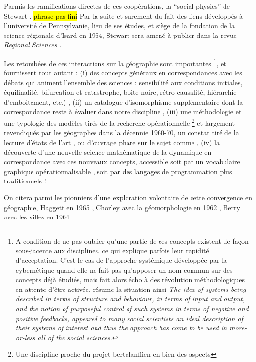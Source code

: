 Parmis les ramifications directes de ces coopérations, la \enquote{social physics} de Stewart \autocite{Stewart1947}. \hl{phrase pas fini}
Par la suite et surement du fait des liens développés à l'université de Pennsylvanie, lieu de ses études, et siège de la fondation de la science régionale d'Isard en 1954, Stewart sera amené à publier dans la revue \textit{Regional Sciences} \autocite{Stewart1958}.

Les retombées de ces interactions sur la géographie sont importantes \footnote{ A condition de ne pas oublier qu'une partie de ces concepts existent de façon sous-jacente aux disciplines, ce qui explique parfois leur rapidité d'acceptation. C'est le cas de l'approche systémique développée par la cybernétique quand elle ne fait pas qu'apposer un nom commun sur des concepts déjà étudiés, mais fait alors écho à des révolution méthodologiques en attente d'être activée. \textcite[5]{Batty1976} résume la situation ainsi \textit{The idea of systems being described in terms of structure and behaviour, in terms of input and output, and the notion of purposeful control of such systems in terms of negative and positive feedbacks, appeared to many social scientists an ideal description of their systems of interest and thus the approach has come to be used in more-or-less all of the social sciences}.}, et fournissent tout autant : (i) des concepts généraux en correspondances avec les débats qui animent l'ensemble des sciences : sensibilité aux conditions initiales, équifinalité, bifurcation et catastrophe, boite noire, rétro-causalité, hiérarchie d'emboitement, etc.) , (ii) un catalogue d'isomorphisme supplémentaire dont la correspondance reste à évaluer dans notre discipline \autocite{Wilson1969}, (iii)  une méthodologie et une typologie des modèles tirés de la recherche opérationnelle \autocite{Ackoff1962} \footnote{Une discipline proche du projet bertalanffien en bien des aspects} et largement revendiqués par les géographes dans la décennie 1960-70, un constat tiré de la lecture  d'états de l'art \autocite{Kohn1970}, ou d'ouvrage phare sur le sujet comme \autocite{Berry1964, Haggett1965}, (iv) la découverte d'une nouvelle science mathématique de la dynamique en correspondance avec ces nouveaux concepts, accessible soit par un vocabulaire graphique opérationnalisable \autocite{Forrester1961}, soit par des langages de programmation plus traditionnels !

On citera parmi les pionniers d'une exploration volontaire de cette convergence en géographie, Haggett en 1965 \autocite{Haggett1965}, Chorley avec la géomorphologie en 1962 \autocite{Chorley1962}, Berry avec les villes en 1964 \autocite{Berry1964}

